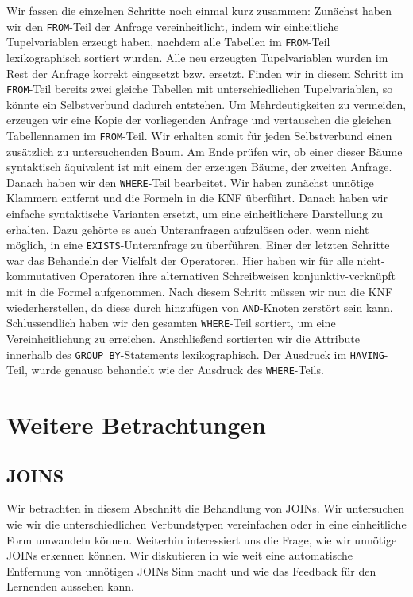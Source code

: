 Wir fassen die einzelnen Schritte noch einmal kurz zusammen: Zunächst haben wir den \verb|FROM|-Teil der Anfrage vereinheitlicht, indem wir einheitliche Tupelvariablen erzeugt haben, nachdem alle Tabellen im \verb|FROM|-Teil lexikographisch sortiert wurden. Alle neu erzeugten Tupelvariablen wurden im Rest der Anfrage korrekt eingesetzt bzw. ersetzt. Finden wir in diesem Schritt im \verb|FROM|-Teil bereits zwei gleiche Tabellen mit unterschiedlichen Tupelvariablen, so könnte ein Selbstverbund dadurch entstehen. Um Mehrdeutigkeiten zu vermeiden, erzeugen wir eine Kopie der vorliegenden Anfrage und vertauschen die gleichen Tabellennamen im \verb|FROM|-Teil. Wir erhalten somit für jeden Selbstverbund einen zusätzlich zu untersuchenden Baum. Am Ende prüfen wir, ob einer dieser Bäume syntaktisch äquivalent ist mit einem der erzeugen Bäume, der zweiten Anfrage. Danach haben wir den \verb|WHERE|-Teil bearbeitet. Wir haben zunächst unnötige Klammern entfernt und die Formeln in die KNF überführt. Danach haben wir einfache syntaktische Varianten ersetzt, um eine einheitlichere Darstellung zu erhalten. Dazu gehörte es auch Unteranfragen aufzulösen oder, wenn nicht möglich, in eine \verb|EXISTS|-Unteranfrage zu überführen. Einer der letzten Schritte war das Behandeln der Vielfalt der Operatoren. Hier haben wir für alle nicht-kommutativen Operatoren ihre alternativen Schreibweisen konjunktiv-verknüpft mit in die Formel aufgenommen. Nach diesem Schritt müssen wir nun die KNF wiederherstellen, da diese durch hinzufügen von \verb|AND|-Knoten zerstört sein kann. Schlussendlich haben wir den gesamten \verb|WHERE|-Teil sortiert, um eine Vereinheitlichung zu erreichen. Anschließend sortierten wir die Attribute innerhalb des \verb|GROUP BY|-Statements lexikographisch. Der Ausdruck im \verb|HAVING|-Teil, wurde genauso behandelt wie der Ausdruck des \verb|WHERE|-Teils. 

\section{Weitere Betrachtungen}

\subsection{JOINS}
\label{subsec:joins}

Wir betrachten in diesem Abschnitt die Behandlung von JOINs. Wir untersuchen wie wir die unterschiedlichen Verbundstypen vereinfachen oder in eine einheitliche Form umwandeln können. Weiterhin interessiert uns die Frage, wie wir unnötige JOINs erkennen können. Wir diskutieren in wie weit eine automatische Entfernung von unnötigen JOINs Sinn macht und wie das Feedback für den Lernenden aussehen kann.

